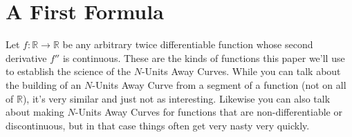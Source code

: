\newcommand\f{ f'(x_o) }
\newcommand\mfrac{ \dfrac{N}{|\f|} \f }
\newcommand\ang{ tan^{-1} \left( -\dfrac{1}{\f} \right) }
\newcommand\mcos{ cos \left( \ang \right) }
\newcommand\msin{ sin \left( \ang \right) }

\newcommand{\firstFormula}{

  \begin{equation} \tag{1} %
    f_N(t) =
    \begin{bmatrix}
      x_N(t) \\
      y_N(t)
    \end{bmatrix} =
    \begin{cases}
      \begin{bmatrix} %
        t - \mfrac \mcos \\
        f(t) + \mfrac \msin
      \end{bmatrix}, &
      t \ni f'(t) \neq 0 \\
      \begin{bmatrix}
        t \\
        f(t) + N
      \end{bmatrix}, &
      t \ni f'(t) = 0
    \end{cases}
  \end{equation}

}

\section{A First Formula}

Let $f: \mathbb{R} \to \mathbb{R}$ be any arbitrary twice differentiable function whose second derivative $f''$
is continuous. These are the kinds of functions this paper we’ll use to establish the science of the $N$-Units Away Curves. While you can talk about the building of an $N$-Units Away Curve from a segment of a function (not on all of $\mathbb{R}$), it’s very similar and just not as interesting. Likewise you can also talk about making $N$-Units Away Curves for functions that are non-differentiable or discontinuous, but in that case things often get very nasty very quickly.

